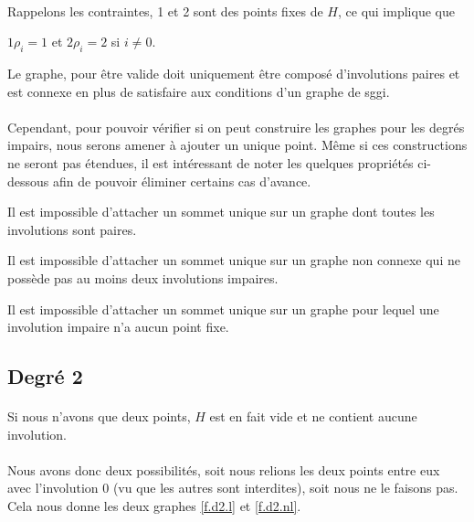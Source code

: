 \paragraph{}
Rappelons les contraintes, 1 et 2 sont des points fixes de $H$, ce qui implique que
\begin{center}
  $1 \rho_i = 1$ et $2 \rho_i = 2$ si $i \neq 0$.
\end{center}
Le graphe, pour être valide doit uniquement être composé d'involutions paires et est connexe en plus de satisfaire aux conditions d'un graphe de sggi.

\paragraph{}
Cependant, pour pouvoir vérifier si on peut construire les graphes pour les degrés impairs, nous serons amener à ajouter un unique point. Même si ces constructions ne seront pas étendues, il est intéressant de noter les quelques propriétés ci-dessous afin de pouvoir éliminer certains cas d'avance.

\begin{lemma}\label{attachEven}
  Il est impossible d'attacher un sommet unique sur un graphe dont toutes les involutions sont paires.
\end{lemma}

\begin{lemma}\label{attachConnexEven}
  Il est impossible d'attacher un sommet unique sur un graphe non connexe qui ne possède pas au moins deux involutions impaires.
\end{lemma}

\begin{lemma}\label{attachNoFixedPoint}
  Il est impossible d'attacher un sommet unique sur un graphe pour lequel une involution impaire n'a aucun point fixe.
\end{lemma}

\subsection{Degré 2}

\paragraph{}
Si nous n'avons que deux points, $H$ est en fait vide et ne contient aucune involution.

\paragraph{}
Nous avons donc deux possibilités, soit nous relions les deux points entre eux avec l'involution 0 (vu que les autres sont interdites), soit nous ne le faisons pas. Cela nous donne les deux graphes \ref{f.d2.l} et \ref{f.d2.nl}.



